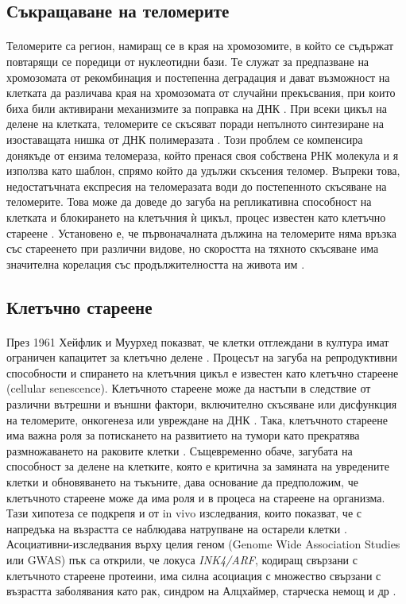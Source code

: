 \documentclass[pdftex,cyrillic,14pt,a4page,twoside,openright]{extreport}
\begin{document}
\subsection{Съкращаване на теломерите}
\paragraph{}
Теломерите са регион, намиращ се в края на хромозомите, в който се съдържат повтарящи се поредици от нуклеотидни бази. Те служат за предпазване на хромозомата от рекомбинация и постепенна деградация и дават възможност на клетката да различава края на хромозомата от случайни прекъсвания, при които биха били активирани механизмите за поправка на ДНК \cite{griffith1999}. При всеки цикъл на делене на клетката, теломерите се скъсяват поради непълното синтезиране на изоставащата нишка от ДНК полимеразата \cite{koliada2015}. Този проблем се компенсира донякъде от ензима теломераза, който пренася своя собствена РНК молекула и я използва като шаблон, спрямо който да удължи скъсения теломер. Въпреки това, недостатъчната експресия на теломеразата води до постепенното скъсяване на теломерите. Това може да доведе до загуба на репликативна способност на клетката и блокирането на клетъчния ѝ цикъл, процес известен като клетъчно стареене \cite{muraki2012}. Установено е, че първоначалната дължина на теломерите няма връзка със стареенето при различни видове, но скоростта на тяхното скъсяване има значителна корелация със продължителността на живота им \cite{whittemore2019}.

\subsection{Клетъчно стареене}
\paragraph{}
През 1961 Хейфлик и Муурхед показват, че клетки отглеждани в култура имат ограничен капацитет за клетъчно делене \cite{hayflick1961serial}. Процесът на загуба на репродуктивни способности и спирането на клетъчния цикъл е известен като клетъчно стареене (cellular senescence). Клетъчното стареене може да настъпи в следствие от различни вътрешни и външни фактори, включително скъсяване или дисфункция на теломерите, онкогенеза или увреждане на ДНК \cite{micco2021}. Така, клетъчното стареене има важна роля за потискането на развитието на тумори като прекратява размножаването на раковите клетки \cite{jeyapalan2008}. Същевременно обаче, загубата на способност за делене на клетките, която е критична за замяната на увредените клетки и обновяването на тъкъните, дава основание да предположим, че клетъчното стареене може да има роля и в процеса на стареене на организма. Тази хипотеза се подкрепя и от in vivo изследвания, които показват, че с напредъка на възрастта се наблюдава натрупване на остарели клетки \cite{jeyapalan2008}. Асоциативни-изследвания върху целия геном (Genome Wide Association Studies или GWAS) пък са открили, че локуса \textit{INK4/ARF}, кодиращ свързани с клетъчното стареене протеини, има силна асоциация с множество свързани с възрастта заболявания като рак, синдром на Алцхаймер, старческа немощ и др \cite{jeck2012meta}.
\end{document}
